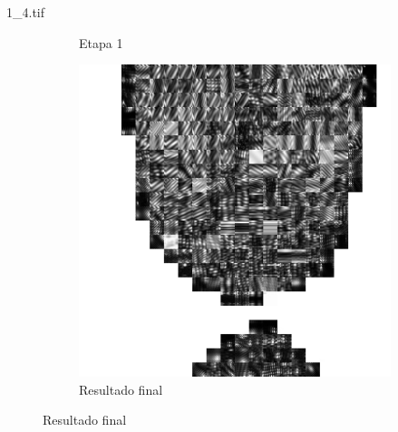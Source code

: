 \documentclass{beamer}
\begin{document}
\begin{frame}{1\_4.tif}
\begin{figure}
\begin{subfigure}[!ht]{0.32\textwidth}
                \caption{Etapa 1}
            \end{subfigure}
            \begin{subfigure}[!ht]{0.32\textwidth}
                \includegraphics[width=\columnwidth]{Fingerprints/1_4_final.jpg}
                \caption{Resultado final}
            \end{subfigure}
        \end{figure}
    \end{frame}
\end{document}
